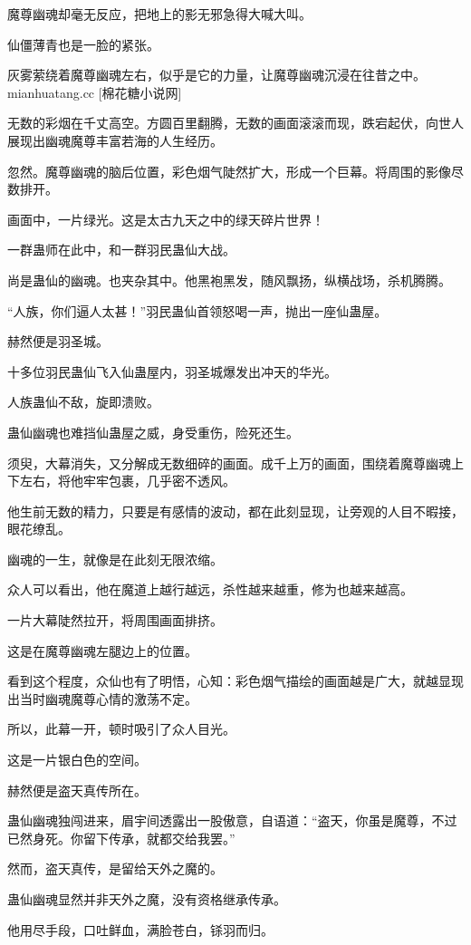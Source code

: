 \begin{this_body}
魔尊幽魂却毫无反应，把地上的影无邪急得大喊大叫。

仙僵薄青也是一脸的紧张。

灰雾萦绕着魔尊幽魂左右，似乎是它的力量，让魔尊幽魂沉浸在往昔之中。mianhuatang.cc [棉花糖小说网]

无数的彩烟在千丈高空。方圆百里翻腾，无数的画面滚滚而现，跌宕起伏，向世人展现出幽魂魔尊丰富若海的人生经历。

忽然。魔尊幽魂的脑后位置，彩色烟气陡然扩大，形成一个巨幕。将周围的影像尽数排开。

画面中，一片绿光。这是太古九天之中的绿天碎片世界！

一群蛊师在此中，和一群羽民蛊仙大战。

尚是蛊仙的幽魂。也夹杂其中。他黑袍黑发，随风飘扬，纵横战场，杀机腾腾。

“人族，你们逼人太甚！”羽民蛊仙首领怒喝一声，抛出一座仙蛊屋。

赫然便是羽圣城。

十多位羽民蛊仙飞入仙蛊屋内，羽圣城爆发出冲天的华光。

人族蛊仙不敌，旋即溃败。

蛊仙幽魂也难挡仙蛊屋之威，身受重伤，险死还生。

须臾，大幕消失，又分解成无数细碎的画面。成千上万的画面，围绕着魔尊幽魂上下左右，将他牢牢包裹，几乎密不透风。

他生前无数的精力，只要是有感情的波动，都在此刻显现，让旁观的人目不暇接，眼花缭乱。

幽魂的一生，就像是在此刻无限浓缩。

众人可以看出，他在魔道上越行越远，杀性越来越重，修为也越来越高。

一片大幕陡然拉开，将周围画面排挤。

这是在魔尊幽魂左腿边上的位置。

看到这个程度，众仙也有了明悟，心知：彩色烟气描绘的画面越是广大，就越显现出当时幽魂魔尊心情的激荡不定。

所以，此幕一开，顿时吸引了众人目光。

这是一片银白色的空间。

赫然便是盗天真传所在。

蛊仙幽魂独闯进来，眉宇间透露出一股傲意，自语道：“盗天，你虽是魔尊，不过已然身死。你留下传承，就都交给我罢。”

然而，盗天真传，是留给天外之魔的。

蛊仙幽魂显然并非天外之魔，没有资格继承传承。

他用尽手段，口吐鲜血，满脸苍白，铩羽而归。


\end{this_body}
